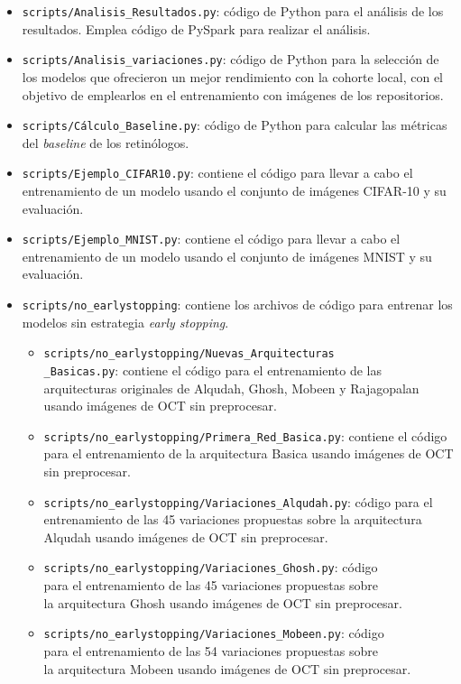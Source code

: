 \begin{itemize}
    \item \texttt{scripts/Analisis\_Resultados.py}: código de Python para el análisis de los resultados. Emplea código de PySpark para realizar el análisis.
    \item \texttt{scripts/Analisis\_variaciones.py}: código de Python para la selección de los modelos que ofrecieron un mejor rendimiento con la cohorte local, con el objetivo de emplearlos en el entrenamiento con imágenes de los repositorios.
    \item \texttt{scripts/Cálculo\_Baseline.py}: código de Python para calcular las métricas del \textit{baseline} de los retinólogos.
    \item \texttt{scripts/Ejemplo\_CIFAR10.py}: contiene el código para llevar a cabo el entrenamiento de un modelo usando el conjunto de imágenes CIFAR-10 y su evaluación.
    \item \texttt{scripts/Ejemplo\_MNIST.py}: contiene el código para llevar a cabo el entrenamiento de un modelo usando el conjunto de imágenes MNIST y su evaluación.
    \item \texttt{scripts/no\_earlystopping}: contiene los archivos de código para entrenar los modelos sin estrategia \textit{early stopping}.
    \begin{itemize}
        \item \texttt{scripts/no\_earlystopping/Nuevas\_Arquitecturas\\\_Basicas.py}: contiene el código para el entrenamiento de las arquitecturas originales de Alqudah, Ghosh, Mobeen y Rajagopalan usando imágenes de OCT sin preprocesar.
        \item \texttt{scripts/no\_earlystopping/Primera\_Red\_Basica.py}: contiene el código para el entrenamiento de la arquitectura Basica usando imágenes de OCT sin preprocesar.
        \item \texttt{scripts/no\_earlystopping/Variaciones\_Alqudah.py}: código para el entrenamiento de las 45 variaciones propuestas sobre la arquitectura Alqudah usando imágenes de OCT sin preprocesar.
        \item \texttt{scripts/no\_earlystopping/Variaciones\_Ghosh.py}: código \\para el entrenamiento de las 45 variaciones propuestas sobre \\la arquitectura Ghosh usando imágenes de OCT sin preprocesar.
        \item \texttt{scripts/no\_earlystopping/Variaciones\_Mobeen.py}: código \\para el entrenamiento de las 54 variaciones propuestas sobre \\la arquitectura Mobeen usando imágenes de OCT sin preprocesar.

\end{itemize}
\end{itemize}

